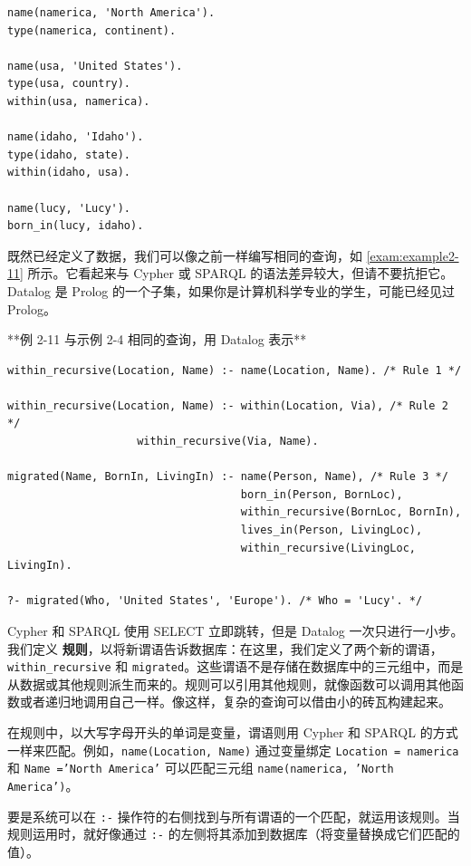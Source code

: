 \begin{lstlisting}[caption={用 Datalog 来表示图 2-5 中的数据子集}]
name(namerica, 'North America').
type(namerica, continent).

name(usa, 'United States').
type(usa, country).
within(usa, namerica).

name(idaho, 'Idaho').
type(idaho, state).
within(idaho, usa).

name(lucy, 'Lucy').
born_in(lucy, idaho).
\end{lstlisting}

既然已经定义了数据，我们可以像之前一样编写相同的查询，如 \autoref{exam:example2-11} 所示。它看起来与 Cypher 或 SPARQL 的语法差异较大，但请不要抗拒它。Datalog 是 Prolog 的一个子集，如果你是计算机科学专业的学生，可能已经见过 Prolog。

**例 2-11 与示例 2-4 相同的查询，用 Datalog 表示**

\label{exam:example2-11}
\begin{lstlisting}
within_recursive(Location, Name) :- name(Location, Name). /* Rule 1 */

within_recursive(Location, Name) :- within(Location, Via), /* Rule 2 */
                    within_recursive(Via, Name).

migrated(Name, BornIn, LivingIn) :- name(Person, Name), /* Rule 3 */
                                    born_in(Person, BornLoc),
                                    within_recursive(BornLoc, BornIn),
                                    lives_in(Person, LivingLoc),
                                    within_recursive(LivingLoc, LivingIn).

?- migrated(Who, 'United States', 'Europe'). /* Who = 'Lucy'. */
\end{lstlisting}

Cypher 和 SPARQL 使用 SELECT 立即跳转，但是 Datalog 一次只进行一小步。我们定义 \textbf{规则}，以将新谓语告诉数据库：在这里，我们定义了两个新的谓语，\texttt{within\_recursive} 和 \texttt{migrated}。这些谓语不是存储在数据库中的三元组中，而是从数据或其他规则派生而来的。规则可以引用其他规则，就像函数可以调用其他函数或者递归地调用自己一样。像这样，复杂的查询可以借由小的砖瓦构建起来。

在规则中，以大写字母开头的单词是变量，谓语则用 Cypher 和 SPARQL 的方式一样来匹配。例如，\texttt{name(Location, Name)} 通过变量绑定 \texttt{Location = namerica} 和 \texttt{Name ='North America'} 可以匹配三元组 \texttt{name(namerica, 'North America')}。

要是系统可以在 \texttt{:-} 操作符的右侧找到与所有谓语的一个匹配，就运用该规则。当规则运用时，就好像通过 \texttt{:-} 的左侧将其添加到数据库（将变量替换成它们匹配的值）。

